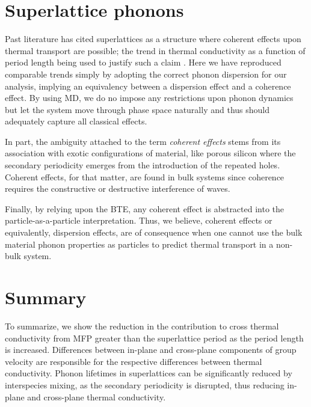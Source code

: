 \documentclass[aps,prb,preprint,preprintnumbers,amsmath,amssymb,floatfix,superscriptaddress]{revtex4}
\begin{document}
\section{Superlattice phonons}

Past literature has cited superlattices as a structure where coherent effects upon thermal transport are possible; the trend in thermal conductivity as a function of period length being used to justify such a claim \cite{PhysRevB.67.195311}. Here we have reproduced comparable trends simply by adopting the correct phonon dispersion for our analysis, implying an equivalency between a dispersion effect and a coherence effect. By using MD, we do no impose any restrictions upon phonon dynamics but let the system move through phase space naturally and thus should adequately capture all classical effects.

In part, the ambiguity attached to the term \textit {coherent effects} stems from its association with exotic configurations of material, like porous silicon \cite{doi:10.1021/nl102918q} where the secondary periodicity emerges from the introduction of the repeated holes. Coherent effects, for that matter, are found in bulk systems since coherence requires the constructive or destructive interference of waves.

Finally, by relying upon the BTE, any coherent effect is abstracted into the particle-as-a-particle interpretation. Thus, we believe, coherent effects or equivalently, dispersion effects, are of consequence when one cannot use the bulk material phonon properties as particles to predict thermal transport in a non-bulk system.

\section{Summary}

To summarize, we show the reduction in the contribution to cross thermal conductivity from MFP greater than the superlattice period as the period length is increased. Differences between in-plane and cross-plane components of group velocity are responsible for the respective differences between thermal conductivity. Phonon lifetimes in superlattices can be significantly reduced by interspecies mixing, as the secondary periodicity is disrupted, thus reducing in-plane and cross-plane thermal conductivity. 

\newpage
%

\end{document}
